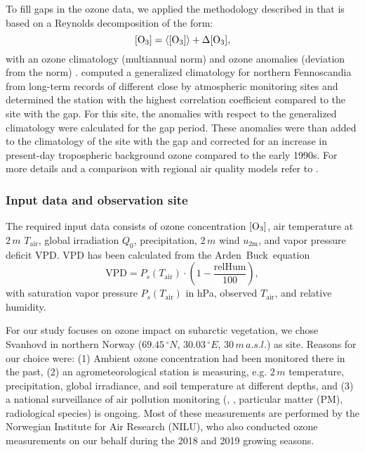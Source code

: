 \documentclass[bg, manuscript]{copernicus}
\begin{document}
To fill gaps in the ozone data, we applied the methodology described in \citet{ACP:Falk2021} that is based on a Reynolds decomposition of the form:
\begin{equation}
  \chem{[O_3]} = \chem{\left<[O_3]\right>} + \chem{\Delta[O_3]},
  \label{eq:reynolds_decomp}
\end{equation}
with an ozone climatology (multiannual norm) \chem{\left<[O_3]\right>} and ozone anomalies (deviation from the norm) \chem{\Delta[O_3]}. \citet{ACP:Falk2021} computed a generalized climatology for northern Fennoscandia from long-term records of different close by atmospheric monitoring sites and determined the station with the highest correlation coefficient compared to the site with the gap. For this site, the anomalies with respect to the generalized climatology were calculated for the gap period. These anomalies were than added to the climatology of the site with the gap and corrected for an increase in present-day tropospheric background ozone compared to the early 1990s. For more details and a comparison with regional air quality models refer to \citet{ACP:Falk2021}.

\subsubsection{Input data and observation site}
\label{subsec:data}
The required input data consists of ozone concentration $\chem{[O_3]}$, air temperature at $2\,\unit{m}$ $T_\mathrm{air}$, global irradiation $Q_0$, precipitation, $2\,\unit{m}$ wind $u_\mathrm{2m}$, and vapor pressure deficit VPD. VPD has been calculated from the Arden~Buck~equation~\citep{JAP:Buck1981, Buck2012}
\begin{equation}
  \mathrm{VPD} = P_s(T_\mathrm{air}) \cdot \left(1-\frac{\mathrm{relHum}}{100}\right),
\end{equation}
with saturation vapor pressure $P_s(T_\mathrm{air})$ in \unit{hPa}, observed $T_\mathrm{air}$, and relative humidity.
 
For our study focuses on ozone impact on subarctic vegetation, we chose Svanhovd in northern Norway ($69.45\,\unit{^\circ N}$, $30.03\,\unit{^\circ E}$, $30\,\unit{m\,a.s.l.}$) as site. Reasons for our choice were: (1) Ambient ozone concentration had been monitored there in the past, (2) an agrometeorological station is measuring, e.g. $2\,\unit{m}$ temperature, precipitation, global irradiance, and soil temperature at different depths, and (3) a national surveillance of air pollution monitoring (, , particular matter (PM), radiological species) is ongoing. Most of these measurements are performed by the Norwegian Institute for Air Research (NILU), who also conducted ozone measurements on our behalf during the 2018 and 2019 growing seasons. 
\end{document}
